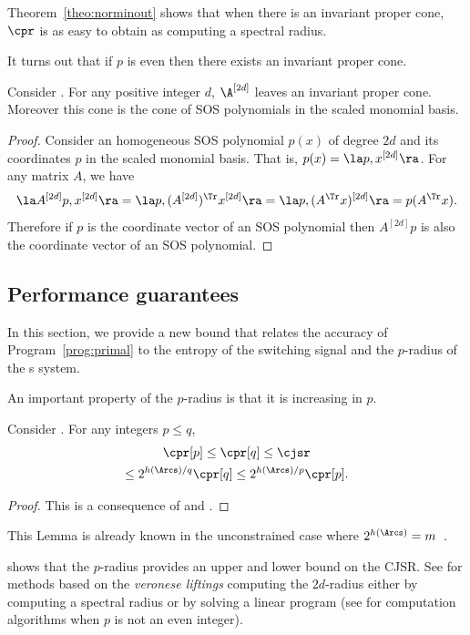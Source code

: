 \documentclass[11pt,twoside,a4paper,openright]{uclouvain-thesis}
\newcommand{\expfrac}[2]{#1/#2}
\begin{document}
Theorem~\ref{theo:norminout} shows that when there is an invariant proper cone,
$\cpr$ is as easy to obtain as computing a spectral radius.

It turns out that if $p$ is even then there exists an invariant proper cone.
\begin{mylem}
  Consider .
  For any positive integer $d$,
  $\A^{[2d]}$ leaves an invariant proper cone.
  Moreover this cone is the cone of SOS polynomials in the
  scaled monomial basis.
  \begin{proof}
    Consider an homogeneous SOS polynomial $p(x)$ of degree $2d$ and
    its coordinates $p$ in the scaled monomial basis. That is,
    $p(x) = \la p,x^{[2d]}\ra$. For any matrix $A$, we have
    \[ \la A^{[2d]}p, x^{[2d]} \ra = \la p, (A^{[2d]})^\Tr x^{[2d]} \ra =
    \la p, (A^\Tr x)^{[2d]} \ra = p(A^\Tr x). \]
    Therefore if $p$ is the coordinate vector of an SOS polynomial
    then $A^{[2d]}p$ is also the coordinate vector of an SOS
    polynomial.
  \end{proof}
\end{mylem}

\subsection{Performance guarantees}
\label{sec:quality}
In this section, we provide a new bound that relates
the accuracy of Program~\ref{prog:primal} to
the entropy of the switching signal and
the $p$-radius of the s\witch{} system.

An important property of the $p$-radius is that it is increasing in $p$.
\begin{mylem}
  \label{lem:incp}
  Consider .
  For any integers $p \leq q$,
  \begin{multline}
    \label{eq:incp}
    \cpr[p] \leq \cpr[q] \leq \cjsr\\
    \leq 2^{\expfrac{h(\Arcs)}{q}} \cpr[q] \leq 2^{\expfrac{h(\Arcs)}{p}} \cpr[p].
  \end{multline}
  \begin{proof}
    This is a consequence of  and .
  \end{proof}
\end{mylem}
This Lemma is already known in the unconstrained case where $2^{h(\Arcs)} = m$~\cite{zhou2002p}.

\begin{myrem}
  \label{rem:incp}
   shows that the $p$-radius provides an upper and lower bound on the CJSR.
  See \cite{blondel2005computationally, parrilo2008approximation} for methods based on the \emph{veronese liftings}
  computing the $2d$-radius either by computing a spectral radius or by solving a linear program
  (see \cite{ogura2016efficient} for computation algorithms when $p$ is not an even integer).
\end{myrem}
\end{document}
